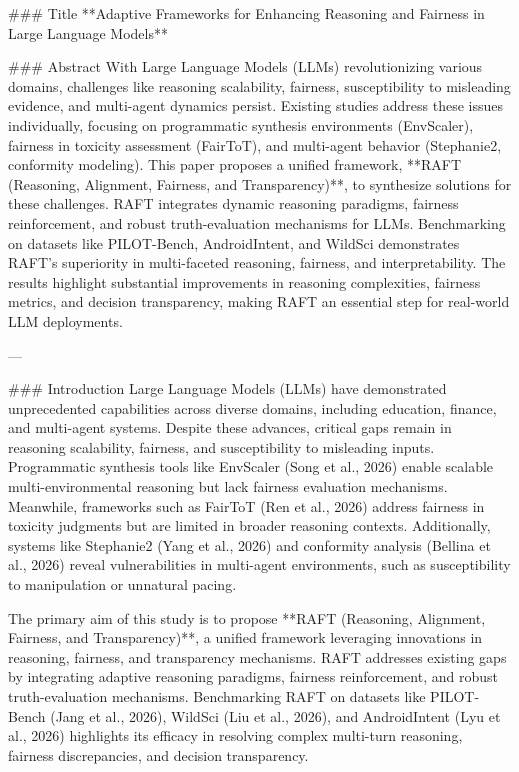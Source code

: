 ### Title  
**Adaptive Frameworks for Enhancing Reasoning and Fairness in Large Language Models**

### Abstract  
With Large Language Models (LLMs) revolutionizing various domains, challenges like reasoning scalability, fairness, susceptibility to misleading evidence, and multi-agent dynamics persist. Existing studies address these issues individually, focusing on programmatic synthesis environments (EnvScaler), fairness in toxicity assessment (FairToT), and multi-agent behavior (Stephanie2, conformity modeling). This paper proposes a unified framework, **RAFT (Reasoning, Alignment, Fairness, and Transparency)**, to synthesize solutions for these challenges. RAFT integrates dynamic reasoning paradigms, fairness reinforcement, and robust truth-evaluation mechanisms for LLMs. Benchmarking on datasets like PILOT-Bench, AndroidIntent, and WildSci demonstrates RAFT's superiority in multi-faceted reasoning, fairness, and interpretability. The results highlight substantial improvements in reasoning complexities, fairness metrics, and decision transparency, making RAFT an essential step for real-world LLM deployments.

---

### Introduction  
Large Language Models (LLMs) have demonstrated unprecedented capabilities across diverse domains, including education, finance, and multi-agent systems. Despite these advances, critical gaps remain in reasoning scalability, fairness, and susceptibility to misleading inputs. Programmatic synthesis tools like EnvScaler (Song et al., 2026) enable scalable multi-environmental reasoning but lack fairness evaluation mechanisms. Meanwhile, frameworks such as FairToT (Ren et al., 2026) address fairness in toxicity judgments but are limited in broader reasoning contexts. Additionally, systems like Stephanie2 (Yang et al., 2026) and conformity analysis (Bellina et al., 2026) reveal vulnerabilities in multi-agent environments, such as susceptibility to manipulation or unnatural pacing.  

The primary aim of this study is to propose **RAFT (Reasoning, Alignment, Fairness, and Transparency)**, a unified framework leveraging innovations in reasoning, fairness, and transparency mechanisms. RAFT addresses existing gaps by integrating adaptive reasoning paradigms, fairness reinforcement, and robust truth-evaluation mechanisms. Benchmarking RAFT on datasets like PILOT-Bench (Jang et al., 2026), WildSci (Liu et al., 2026), and AndroidIntent (Lyu et al., 2026) highlights its efficacy in resolving complex multi-turn reasoning, fairness discrepancies, and decision transparency.

